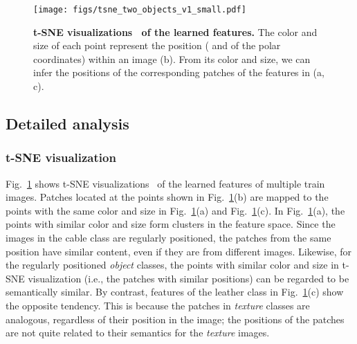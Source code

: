 \documentclass[runningheads]{llncs}
\begin{document}
\begin{figure}[t]
    \centering
    \texttt{[image: figs/tsne\_two\_objects\_v1\_small.pdf]}
    \caption{\textbf{t-SNE visualizations~\cite{tsne} of the learned features.} The color and size of each point represent the position ( and  of the polar coordinates) within an image (b). From its color and size, we can infer the positions of the corresponding patches of the features in (a, c).
    }
    \label{fig:tsne}
    \vspace{-5pt}
\end{figure}
 
\subsection{Detailed analysis}
\subsubsection{t-SNE visualization}
Fig.~\ref{fig:tsne} shows t-SNE visualizations~\cite{tsne} of the learned features of multiple train images.
Patches located at the points shown in Fig.~\ref{fig:tsne}(b) are mapped to the points with the same color and size in Fig.~\ref{fig:tsne}(a) and Fig.~\ref{fig:tsne}(c).
In Fig.~\ref{fig:tsne}(a), the points with similar color and size form clusters in the feature space.
Since the images in the cable class are regularly positioned, the patches from the same position have similar content, even if they are from different images.
Likewise, for the regularly positioned \textit{object} classes, the points with similar color and size in t-SNE visualization (i.e., the patches with similar positions) can be regarded to be semantically similar.
By contrast, features of the leather class in Fig.~\ref{fig:tsne}(c) show the opposite tendency.
This is because the patches in \textit{texture} classes are analogous, regardless of their position in the image; the positions of the patches are not quite related to their semantics for the \textit{texture} images.
\end{document}

